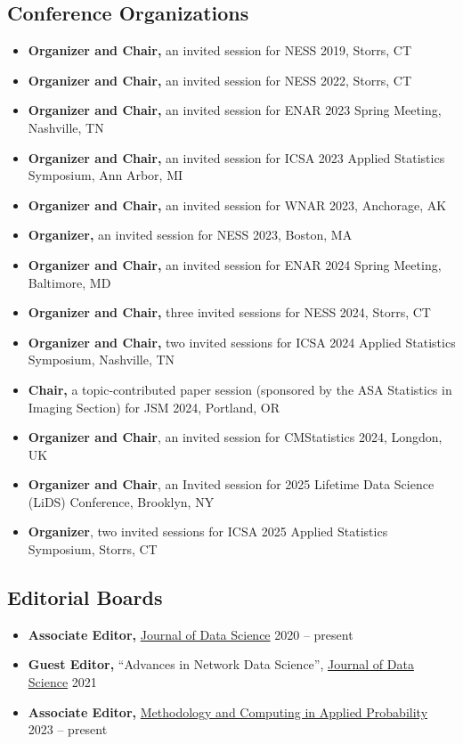 \documentclass[12pt]{article}
\begin{document}
	\subsection*{Conference Organizations}
	\begin{itemize}
		\item {\bf Organizer and Chair,} an invited session for NESS 
		2019, Storrs, CT
		\item {\bf Organizer and Chair,} an invited session for NESS 
		2022, Storrs, CT
		\item {\bf Organizer and Chair,} an invited session for ENAR 
		2023 Spring Meeting, Nashville, TN
		\item {\bf Organizer and Chair,} an invited session for ICSA 
		2023 Applied Statistics Symposium, Ann Arbor, MI
		\item {\bf Organizer and Chair,} an invited session for WNAR 
		2023, Anchorage, AK
		\item {\bf Organizer,} an invited session for NESS 2023, 
		Boston, MA
		\item {\bf Organizer and Chair,} an invited session for ENAR 
		2024 Spring Meeting, Baltimore, MD
		\item {\bf Organizer and Chair,} three invited sessions for 
		NESS 2024, Storrs, CT
		\item {\bf Organizer and Chair,} two invited sessions for 
		ICSA 2024 Applied Statistics Symposium, Nashville, TN
		\item {\bf Chair,} a topic-contributed paper session 
		(sponsored by the ASA Statistics in Imaging Section) for JSM 
		2024, Portland, OR
		\item {\bf Organizer and Chair}, an invited session for 
		CMStatistics 2024, Longdon, UK 
		\item {\bf Organizer and Chair}, an Invited session for 2025 
		Lifetime Data Science (LiDS) Conference, Brooklyn, NY 
		\item {\bf Organizer}, two invited sessions for ICSA 2025 
		Applied Statistics Symposium, Storrs, CT
	\end{itemize}
	
	
	\subsection*{Editorial Boards}
	\begin{itemize}
		\item \textbf{Associate Editor,} 
		\href{https://jds-online.org/journal/JDS}{Journal of Data Science} \hfill 2020 -- present
		\item \textbf{Guest Editor,} ``Advances in Network Data 
		Science'', \href{https://jds-online.org/journal/JDS}{Journal 
		of Data Science} \hfill 2021
		\item \textbf{Associate Editor,}
		\href{https://www.springer.com/journal/11009/}{Methodology 
		and Computing in Applied Probability} \hfill 2023 -- present
	\end{itemize}
\end{document}
